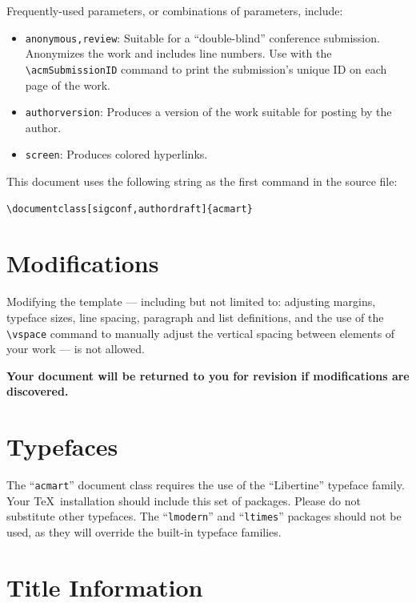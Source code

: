 \documentclass[sigconf, authordraft]{acmart}
\begin{document}
	Frequently-used parameters, or combinations of parameters, include:
	\begin{itemize}
		\item {\verb|anonymous,review|}: Suitable for a ``double-blind'' conference
			submission. Anonymizes the work and includes line numbers. Use with the
			\verb|\acmSubmissionID| command to print the submission's unique ID on
			each page of the work.

		\item {\verb|authorversion|}: Produces a version of the work suitable for
			posting by the author.

		\item {\verb|screen|}: Produces colored hyperlinks.
	\end{itemize}

	This document uses the following string as the first command in the source
	file: \begin{verbatim}
\documentclass[sigconf,authordraft]{acmart}
\end{verbatim}

	\section{Modifications}


	Modifying the template --- including but not limited to: adjusting margins,
	typeface sizes, line spacing, paragraph and list definitions, and the use of the
	\verb|\vspace| command to manually adjust the vertical spacing between elements
	of your work --- is not allowed.

	{\bfseries Your document will be returned to you for revision if modifications are discovered.}

	\section{Typefaces}


	The ``\verb|acmart|'' document class requires the use of the ``Libertine''
	typeface family. Your \TeX\ installation should include this set of packages.
	Please do not substitute other typefaces. The ``\verb|lmodern|'' and ``\verb|ltimes|''
	packages should not be used, as they will override the built-in typeface
	families.

	\section{Title Information}
\end{document}
